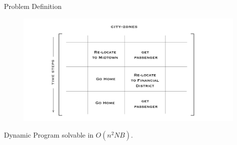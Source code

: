 \begin{frame}{Problem Definition}
{\begin{figure}
	\includegraphics[scale=0.45]{figures/matrix5.pdf}
	\end{figure}
	}
	\pause
	\alert{Dynamic Program solvable in $O(n^2NB)$.}
\end{frame}